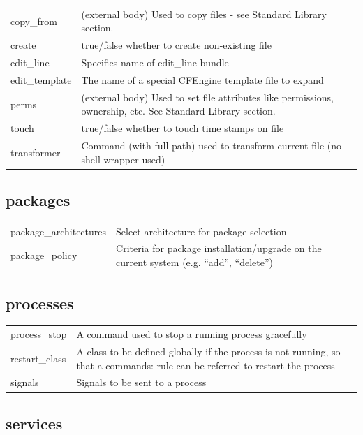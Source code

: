 \begin{longtable}{|l|l|}
\hline
copy\_from & (external body) Used to copy files - see Standard Library section.\\
create & true/false whether to create non-existing file\\
edit\_line & Specifies name of edit\_line bundle\\
edit\_template & The name of a special CFEngine template file to expand\\
perms & (external body) Used to set file attributes like permissions, ownership, etc.  See Standard Library section.\\
touch & true/false whether to touch time stamps on file\\
transformer & Command (with full path) used to transform current file (no shell wrapper used)\\
\hline
\end{longtable}

\subsection{packages}

\begin{longtable}{|l|l|}
\hline
package\_architectures & Select architecture for package selection\\
package\_policy & Criteria for package installation/upgrade on the current system (e.g. ``add'', ``delete'')\\
\hline
\end{longtable}

\subsection{processes}

\begin{longtable}{|l|l|}
\hline
process\_stop & A command used to stop a running process gracefully\\
restart\_class & A class to be defined globally if the process is not running, so that a commands: rule can be referred to restart the process\\
signals & Signals to be sent to a process\\
\hline
\end{longtable}

\subsection{services}


